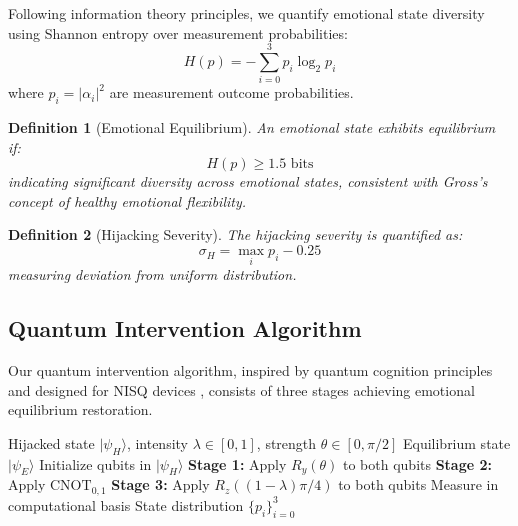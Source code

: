 \documentclass[11pt,letterpaper]{article}
\newtheorem{definition}{Definition}[section]
\newcommand{\ket}[1]{|#1\rangle}
\begin{document}
Following information theory principles, we quantify emotional state diversity using Shannon entropy over measurement probabilities:
\begin{equation}
H(p) = -\sum_{i=0}^{3} p_i \log_2 p_i
\label{eq:shannon_entropy}
\end{equation}
where $p_i = |\alpha_i|^2$ are measurement outcome probabilities.

\begin{definition}[Emotional Equilibrium]
\label{def:equilibrium}
An emotional state exhibits equilibrium if:
\begin{equation}
H(p) \geq 1.5 \text{ bits}
\end{equation}
indicating significant diversity across emotional states, consistent with Gross's \cite{gross1998antecedent} concept of healthy emotional flexibility.
\end{definition}

\begin{definition}[Hijacking Severity]
\label{def:severity}
The hijacking severity is quantified as:
\begin{equation}
\sigma_H = \max_i p_i - 0.25
\label{eq:hijacking_severity}
\end{equation}
measuring deviation from uniform distribution.
\end{definition}

\subsection{Quantum Intervention Algorithm}

Our quantum intervention algorithm, inspired by quantum cognition principles \cite{busemeyer2012quantum} and designed for NISQ devices \cite{preskill2018quantum}, consists of three stages achieving emotional equilibrium restoration.

\begin{algorithm}[H]
\caption{Quantum Emotional Intervention}
\label{alg:intervention}
\begin{algorithmic}[1]
\Require Hijacked state $\ket{\psi_H}$, intensity $\lambda \in [0,1]$, strength $\theta \in [0,\pi/2]$
\Ensure Equilibrium state $\ket{\psi_E}$
\State Initialize qubits in $\ket{\psi_H}$
\State \textbf{Stage 1:} Apply $R_y(\theta)$ to both qubits 
\State \textbf{Stage 2:} Apply $\text{CNOT}_{0,1}$ 
\State \textbf{Stage 3:} Apply $R_z((1-\lambda)\pi/4)$ to both qubits 
\State Measure in computational basis
\State \Return State distribution $\{p_i\}_{i=0}^3$
\end{algorithmic}
\end{algorithm}
\end{document}

